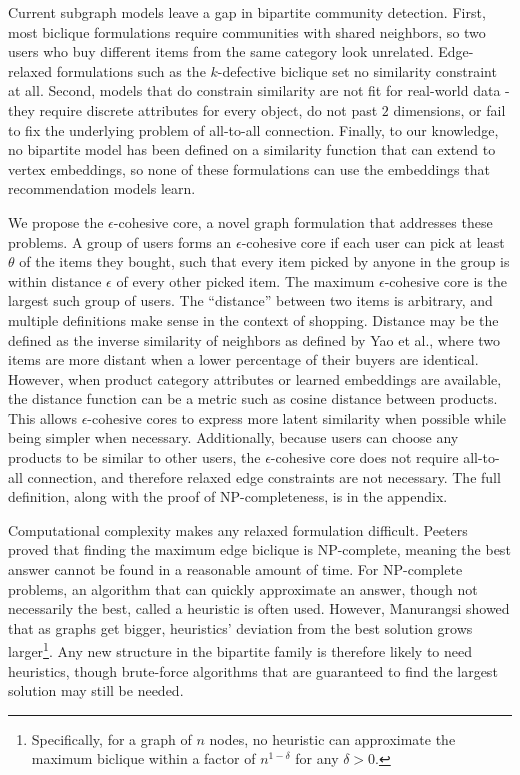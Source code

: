 \documentclass[conference]{IEEEtran}
\begin{document}
Current subgraph models leave a gap in bipartite community detection. First, most biclique formulations require communities with shared neighbors, so two users who buy different items from the same category look unrelated. Edge-relaxed formulations such as the $k$-defective biclique set no similarity constraint at all. Second, models that do constrain similarity are not fit for real-world data - they require discrete attributes for every object, do not past $2$ dimensions, or fail to fix the underlying problem of all-to-all connection. Finally, to our knowledge, no bipartite model has been defined on a similarity function that can extend to vertex embeddings, so none of these formulations can use the embeddings that recommendation models learn.

We propose the $\epsilon$-cohesive core, a novel graph formulation that addresses these problems. A group of users forms an $\epsilon$-cohesive core if each user can pick at least $\theta$ of the items they bought, such that every item picked by anyone in the group is within distance $\epsilon$ of every other picked item. The maximum $\epsilon$-cohesive core is the largest such group of users. The ``distance'' between two items is arbitrary, and multiple definitions make sense in the context of shopping. Distance may be the defined as the inverse similarity of neighbors as defined by Yao et al., where two items are more distant when a lower percentage of their buyers are identical. However, when product category attributes or learned embeddings are available, the distance function can be a metric such as cosine distance between products. This allows $\epsilon$-cohesive cores to express more latent similarity when possible while being simpler when necessary. Additionally, because users can choose any products to be similar to other users, the $\epsilon$-cohesive core does not require all-to-all connection, and therefore relaxed edge constraints are not necessary. The full definition, along with the proof of NP-completeness, is in the appendix.

Computational complexity makes any relaxed formulation difficult. Peeters \cite{peeters2000} proved that finding the maximum edge biclique is NP-complete, meaning the best answer cannot be found in a reasonable amount of time. For NP-complete problems, an algorithm that can quickly approximate an answer, though not necessarily the best, called a heuristic is often used. However, Manurangsi \cite{manurangsi2017} showed that as graphs get bigger, heuristics' deviation from the best solution grows larger\footnote{Specifically, for a graph of $n$ nodes, no heuristic can approximate the maximum biclique within a factor of $n^{1-\delta}$ for any $\delta > 0$.}. Any new structure in the bipartite family is therefore likely to need heuristics, though brute-force algorithms that are guaranteed to find the largest solution may still be needed.
\end{document}
